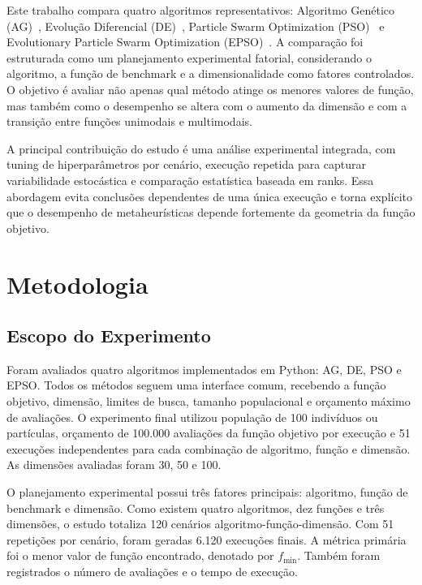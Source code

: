 \documentclass[runningheads]{llncs}
\begin{document}
Este trabalho compara quatro algoritmos representativos: Algoritmo Genético (AG)~\cite{goldberg1989genetic}, Evolução Diferencial (DE)~\cite{storn1997differential}, Particle Swarm Optimization (PSO)~\cite{kennedy1995particle} e Evolutionary Particle Swarm Optimization (EPSO)~\cite{miranda2002epso}. A comparação foi estruturada como um planejamento experimental fatorial, considerando o algoritmo, a função de benchmark e a dimensionalidade como fatores controlados. O objetivo é avaliar não apenas qual método atinge os menores valores de função, mas também como o desempenho se altera com o aumento da dimensão e com a transição entre funções unimodais e multimodais.

A principal contribuição do estudo é uma análise experimental integrada, com tuning de hiperparâmetros por cenário, execução repetida para capturar variabilidade estocástica e comparação estatística baseada em ranks. Essa abordagem evita conclusões dependentes de uma única execução e torna explícito que o desempenho de metaheurísticas depende fortemente da geometria da função objetivo.

\section{Metodologia}

\subsection{Escopo do Experimento}

Foram avaliados quatro algoritmos implementados em Python: AG, DE, PSO e EPSO. Todos os métodos seguem uma interface comum, recebendo a função objetivo, dimensão, limites de busca, tamanho populacional e orçamento máximo de avaliações. O experimento final utilizou população de 100 indivíduos ou partículas, orçamento de 100.000 avaliações da função objetivo por execução e 51 execuções independentes para cada combinação de algoritmo, função e dimensão. As dimensões avaliadas foram 30, 50 e 100.

O planejamento experimental possui três fatores principais: algoritmo, função de benchmark e dimensão. Como existem quatro algoritmos, dez funções e três dimensões, o estudo totaliza 120 cenários algoritmo-função-dimensão. Com 51 repetições por cenário, foram geradas 6.120 execuções finais. A métrica primária foi o menor valor de função encontrado, denotado por $f_{\min}$. Também foram registrados o número de avaliações e o tempo de execução.
\end{document}
